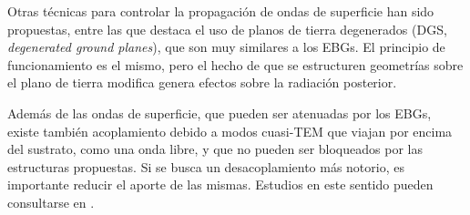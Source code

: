 Otras técnicas para controlar la propagación de ondas de superficie han sido propuestas, entre las que destaca el uso de planos de tierra degenerados (DGS, \textit{degenerated ground planes}), que son muy similares a los EBGs. El principio de funcionamiento es el mismo, pero el hecho de que se estructuren geometrías sobre el plano de tierra modifica genera efectos sobre la radiación posterior.

Además de las ondas de superficie, que pueden ser atenuadas por los EBGs, existe también acoplamiento debido a modos cuasi-TEM que viajan por encima del sustrato, como una onda libre, y que no pueden ser bloqueados por las estructuras propuestas. Si se busca un desacoplamiento más notorio, es importante reducir el aporte de las mismas. Estudios en este sentido pueden consultarse en \cite{Asimonis:designoptimization}.



